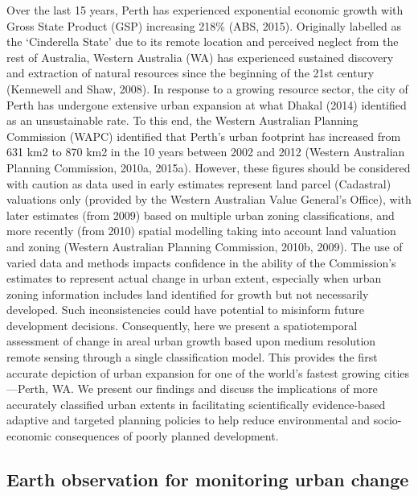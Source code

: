 \documentclass[]{book}
\begin{document}
Over the last 15 years, Perth has experienced exponential economic
growth with Gross State Product (GSP) increasing 218\% (ABS, 2015).
Originally labelled as the `Cinderella State' due to its remote location
and perceived neglect from the rest of Australia, Western Australia (WA)
has experienced sustained discovery and extraction of natural resources
since the beginning of the 21st century (Kennewell and Shaw, 2008). In
response to a growing resource sector, the city of Perth has undergone
extensive urban expansion at what Dhakal (2014) identified as an
unsustainable rate. To this end, the Western Australian Planning
Commission (WAPC) identified that Perth's urban footprint has increased
from 631 km2 to 870 km2 in the 10 years between 2002 and 2012 (Western
Australian Planning Commission, 2010a, 2015a). However, these figures
should be considered with caution as data used in early estimates
represent land parcel (Cadastral) valuations only (provided by the
Western Australian Value General's Office), with later estimates (from
2009) based on multiple urban zoning classifications, and more recently
(from 2010) spatial modelling taking into account land valuation and
zoning (Western Australian Planning Commission, 2010b, 2009). The use of
varied data and methods impacts confidence in the ability of the
Commission's estimates to represent actual change in urban extent,
especially when urban zoning information includes land identified for
growth but not necessarily developed. Such inconsistencies could have
potential to misinform future development decisions. Consequently, here
we present a spatiotemporal assessment of change in areal urban growth
based upon medium resolution remote sensing through a single
classification model. This provides the first accurate depiction of
urban expansion for one of the world's fastest growing cities---Perth,
WA. We present our findings and discuss the implications of more
accurately classified urban extents in facilitating scientifically
evidence-based adaptive and targeted planning policies to help reduce
environmental and socio-economic consequences of poorly planned
development.

\subsection{Earth observation for monitoring urban
change}\label{earth-observation-for-monitoring-urban-change}
\end{document}
